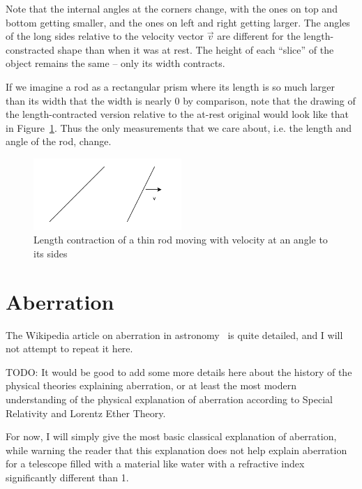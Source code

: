 \documentclass[a4paper]{article}
\theoremstyle{plain}
\theoremstyle{definition}
\newcommand{\vect}[1]{\vec{#1}}
\begin{document}
Note that the internal angles at the corners change, with the ones on
top and bottom getting smaller, and the ones on left and right getting
larger.  The angles of the long sides relative to the velocity vector
$\vect{v}$ are different for the length-constracted shape than when it
was at rest.  The height of each ``slice'' of the object remains the
same -- only its width contracts.

If we imagine a rod as a rectangular prism where its length is so much
larger than its width that the width is nearly 0 by comparison, note
that the drawing of the length-contracted version relative to the
at-rest original would look like that in
Figure~\ref{fig:diagonal-length-contraction-of-rod}.  Thus the only
measurements that we care about, i.e. the length and angle of the rod,
change.
\begin{figure}[ht]
	\centering
	\includegraphics[width=0.5\textwidth]{length-contraction-rod-at-angle-cropped.pdf}
	\caption{Length contraction of a thin rod moving with velocity at an angle to its sides}
	\label{fig:diagonal-length-contraction-of-rod}
\end{figure}


\section{Aberration}
\label{app:aberration}

The Wikipedia article on aberration in
astronomy~\cite{AberrationAstronomy} is quite detailed, and I will not
attempt to repeat it here.

TODO: It would be good to add some more details here about the history
of the physical theories explaining aberration, or at least the most
modern understanding of the physical explanation of aberration
according to Special Relativity and Lorentz Ether Theory.

For now, I will simply give the most basic classical explanation of
aberration, while warning the reader that this explanation does not
help explain aberration for a telescope filled with a material like
water with a refractive index significantly different than 1.
\end{document}

